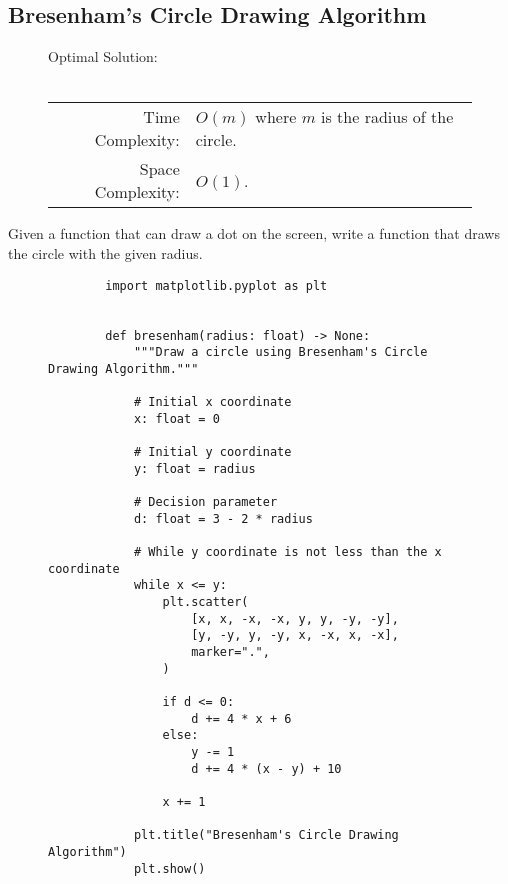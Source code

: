 
\subsection{Bresenham's Circle Drawing Algorithm}

\begin{figure}[H]
    Optimal Solution:\\\\
    \begin{tabular}{rl}
        Time Complexity:& \(O(m)\) where \(m\) is the radius of the circle.\\
        Space Complexity:& \(O(1)\).
    \end{tabular}
\end{figure}

Given a function that can draw a dot on the screen, write a function that draws
the circle with the given radius.

\begin{figure}[H]
    \centering
    \begin{verbatim}
        import matplotlib.pyplot as plt


        def bresenham(radius: float) -> None:
            """Draw a circle using Bresenham's Circle Drawing Algorithm."""

            # Initial x coordinate
            x: float = 0

            # Initial y coordinate
            y: float = radius

            # Decision parameter
            d: float = 3 - 2 * radius

            # While y coordinate is not less than the x coordinate
            while x <= y:
                plt.scatter(
                    [x, x, -x, -x, y, y, -y, -y],
                    [y, -y, y, -y, x, -x, x, -x],
                    marker=".",
                )

                if d <= 0:
                    d += 4 * x + 6
                else:
                    y -= 1
                    d += 4 * (x - y) + 10

                x += 1

            plt.title("Bresenham's Circle Drawing Algorithm")
            plt.show()
    \end{verbatim}
\end{figure}
